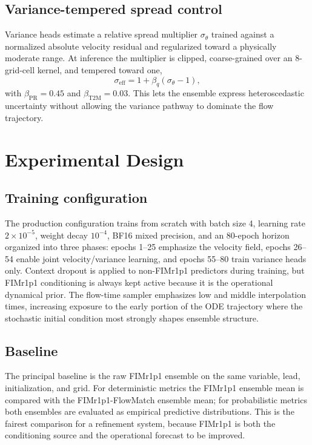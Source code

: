 \documentclass[11pt]{article}
\newcommand{\modelshort}{FIMr1p1}
\newcommand{\methodname}{\modelshort{}-FlowMatch}
\begin{document}
\subsection{Variance-tempered spread control}

Variance heads estimate a relative spread multiplier $\sigma_\theta$ trained against a normalized absolute velocity residual and regularized toward a physically moderate range. At inference the multiplier is clipped, coarse-grained over an 8-grid-cell kernel, and tempered toward one,
\begin{equation}
  \sigma_{\mathrm{eff}} = 1 + \beta_q(\sigma_{\theta}-1),
\end{equation}
with $\beta_{\mathrm{PR}}=0.45$ and $\beta_{\mathrm{T2M}}=0.03$. This lets the ensemble express heteroscedastic uncertainty without allowing the variance pathway to dominate the flow trajectory.

\FloatBarrier

\section{Experimental Design}
\label{sec:design}

\subsection{Training configuration}

The production configuration trains from scratch with batch size 4, learning rate $2\times10^{-5}$, weight decay $10^{-4}$, BF16 mixed precision, and an 80-epoch horizon organized into three phases: epochs 1--25 emphasize the velocity field, epochs 26--54 enable joint velocity/variance learning, and epochs 55--80 train variance heads only. Context dropout is applied to non-\modelshort{} predictors during training, but \modelshort{} conditioning is always kept active because it is the operational dynamical prior. The flow-time sampler emphasizes low and middle interpolation times, increasing exposure to the early portion of the ODE trajectory where the stochastic initial condition most strongly shapes ensemble structure.

\subsection{Baseline}

The principal baseline is the raw \modelshort{} ensemble on the same variable, lead, initialization, and grid. For deterministic metrics the \modelshort{} ensemble mean is compared with the \methodname{} ensemble mean; for probabilistic metrics both ensembles are evaluated as empirical predictive distributions. This is the fairest comparison for a refinement system, because \modelshort{} is both the conditioning source and the operational forecast to be improved.
\end{document}
